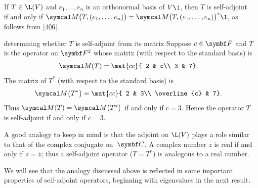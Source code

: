 {  \addtolength{\abovedisplayskip}{-.035in} \addtolength{\abovedisplayshortskip}{-.035in} \addtolength{\belowdisplayskip}{-.035in}
\addtolength{\belowdisplayshortskip}{-.035in} %


If $T \in \L(V)$ and $e_1, \ldots, e_n$ is an orthonormal basis of $V\1$, then $T$ is self-adjoint if and only if
$\M\paren[\big]{ T, (e_1, \ldots, e_n) } = \M\paren[\big]{ T, (e_1, \ldots, e_n) }^*\1$, as follows from \ref{406}.

\begin{example}{determining whether\/ $T$ is self-adjoint from its matrix}
Suppose $c \in \F{}$ and $T$ is the operator on $\F{2}$ whose matrix (with respect to the standard basis) is
\[
\M(T) = \mat{cc}{
2 & c\\
3 & 7}.
\]
The matrix of $T^*$ (with respect to the standard basis) is
\[
\M\paren[\big]{T^*} = \mat{cc}{
2 & 3\\
\overline{c} & 7}.
\]
Thus $\M(T) = \M\paren[\big]{T^*}$ if and only if $c = 3$. Hence the operator $T$ is self-adjoint if and only if $c = 3$.
\end{example}



A good analogy to keep in mind is that the adjoint on $\L(V)$ plays a role similar to that of the complex  conjugate on~$\C{}$. A complex number $z$ is real if and only if $z = \bar{z}$; thus a self-adjoint operator ($T = T^*$) is analogous to a real number.


We will see  that the analogy discussed above is reflected in some
important properties of self-adjoint operators, beginning with eigenvalues in the next result.

}
